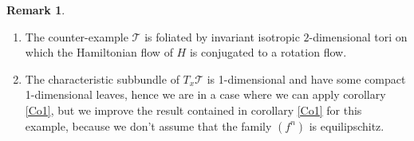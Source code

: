 \documentclass{dcds}
\theoremstyle{definition}
\newtheorem{remark}{Remark}
\begin{document}
  \begin{remark} \begin{enumerate}
  \item The counter-example ${\mathcal {T}}$ is foliated by invariant isotropic $2$-dimen\-sional tori on which the Hamiltonian  flow of $H$ is conjugated to a rotation flow.
  \item The characteristic subbundle of $T_x{\mathcal {T}}$ is 1-dimensional and have some compact 1-dimensional leaves, hence we are in  a case where we can apply corollary \ref{Co1}, but we improve the result contained in corollary \ref{Co1} for this example, because we don't assume that the family $(f^n)$ is equilipschitz.

  \end{enumerate}
  \end{remark}
\end{document}
